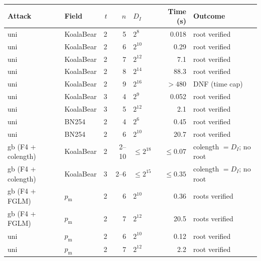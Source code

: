 \documentclass[11pt,a4paper]{article}
\theoremstyle{definition}
\begin{document}
\smallskip
\begin{center}
\small
\begin{tabular}{@{}llrrlrl@{}}
\toprule
Attack & Field & $t$ & $n$ & $D_I$ & Time (s) & Outcome \\
\midrule
\textsf{uni} & KoalaBear & 2 & 5 & $2^{8}$  & 0.018 & root verified \\
\textsf{uni} & KoalaBear & 2 & 6 & $2^{10}$ & 0.29  & root verified \\
\textsf{uni} & KoalaBear & 2 & 7 & $2^{12}$ & 7.1   & root verified \\
\textsf{uni} & KoalaBear & 2 & 8 & $2^{14}$ & 88.3  & root verified \\
\textsf{uni} & KoalaBear & 2 & 9 & $2^{16}$ & $>480$ & DNF (time cap) \\
\textsf{uni} & KoalaBear & 3 & 4 & $2^{9}$  & 0.052 & root verified \\
\textsf{uni} & KoalaBear & 3 & 5 & $2^{12}$ & 2.1   & root verified \\
\textsf{uni} & BN254     & 2 & 4 & $2^{6}$  & 0.45  & root verified \\
\textsf{uni} & BN254     & 2 & 6 & $2^{10}$ & 20.7  & root verified \\
\textsf{gb} (F4 + colength) & KoalaBear & 2 & 2--10 & $\le 2^{18}$ & $\le 0.07$ & colength $= D_I$; no root \\
\textsf{gb} (F4 + colength) & KoalaBear & 3 & 2--6  & $\le 2^{15}$ & $\le 0.35$ & colength $= D_I$; no root \\
\textsf{gb} (F4 + FGLM) & $p_{\mathrm{m}}$ & 2 & 6 & $2^{10}$ & 0.36 & roots verified \\
\textsf{gb} (F4 + FGLM) & $p_{\mathrm{m}}$ & 2 & 7 & $2^{12}$ & 20.5 & roots verified \\
\textsf{uni} & $p_{\mathrm{m}}$ & 2 & 6 & $2^{10}$ & 0.12 & root verified \\
\textsf{uni} & $p_{\mathrm{m}}$ & 2 & 7 & $2^{12}$ & 2.2  & root verified \\
\bottomrule
\end{tabular}
\end{center}
\smallskip
\end{document}

